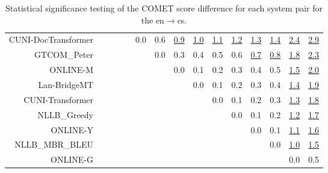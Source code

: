 \documentclass[11pt]{article}
\begin{document}
\begin{sidewaystable}
\begin{center}
{\begin{tabular}{rcccccccccccccc}
CUNI-DocTransformer &    &  &  &  & \cellcolor{red!0} 0.0 & \cellcolor{red!60} 0.6 & \cellcolor{red!70} \underline{0.9} & \cellcolor{red!70} \underline{1.0} & \cellcolor{red!70} \underline{1.1} & \cellcolor{red!70} \underline{1.2} & \cellcolor{red!70} \underline{1.3} & \cellcolor{red!70} \underline{1.4} & \cellcolor{red!70} \underline{2.4} & \cellcolor{red!70} \underline{2.9}\\ 
GTCOM\_Peter &  &    &  &  &  & \cellcolor{red!0} 0.0 & \cellcolor{red!0} 0.3 & \cellcolor{red!40} 0.4 & \cellcolor{red!60} 0.5 & \cellcolor{red!60} 0.6 & \cellcolor{red!70} \underline{0.7} & \cellcolor{red!70} \underline{0.8} & \cellcolor{red!70} \underline{1.8} & \cellcolor{red!70} \underline{2.3}\\ 
ONLINE-M &    &  &  &  &  &  & \cellcolor{red!0} 0.0 & \cellcolor{red!0} 0.1 & \cellcolor{red!0} 0.2 & \cellcolor{red!0} 0.3 & \cellcolor{red!50} 0.4 & \cellcolor{red!60} 0.5 & \cellcolor{red!70} \underline{1.5} & \cellcolor{red!70} \underline{2.0}\\ 
Lan-BridgeMT &    &  &  &  &  &  &  & \cellcolor{red!0} 0.0 & \cellcolor{red!0} 0.1 & \cellcolor{red!0} 0.2 & \cellcolor{red!30} 0.3 & \cellcolor{red!60} 0.4 & \cellcolor{red!70} \underline{1.4} & \cellcolor{red!70} \underline{1.9}\\ 
CUNI-Transformer &    &  &  &  &  &  &  &  & \cellcolor{red!0} 0.0 & \cellcolor{red!0} 0.1 & \cellcolor{red!0} 0.2 & \cellcolor{red!0} 0.3 & \cellcolor{red!70} \underline{1.3} & \cellcolor{red!70} \underline{1.8}\\ 
NLLB\_Greedy &    &  &  &  &  &  &  &  &  & \cellcolor{red!0} 0.0 & \cellcolor{red!0} 0.1 & \cellcolor{red!30} 0.2 & \cellcolor{red!70} \underline{1.2} & \cellcolor{red!70} \underline{1.7}\\ 
ONLINE-Y &  &    &  &  &  &  &  &  &  &  & \cellcolor{red!0} 0.0 & \cellcolor{red!0} 0.1 & \cellcolor{red!70} \underline{1.1} & \cellcolor{red!70} \underline{1.6}\\ 
NLLB\_MBR\_BLEU &    &  &  &  &  &  &  &  &  &  &  & \cellcolor{red!0} 0.0 & \cellcolor{red!70} \underline{1.0} & \cellcolor{red!70} \underline{1.5}\\ 
ONLINE-G &  &    &  &  &  &  &  &  &  &  &  &  & \cellcolor{red!0} 0.0 & \cellcolor{red!30} 0.5\\ 
\bottomrule 
\end{tabular} }
\caption{Statistical significance testing of the COMET score difference for each system pair for the en$\rightarrow$cs.} 
 \end{center} \end{sidewaystable} 
\end{document}
